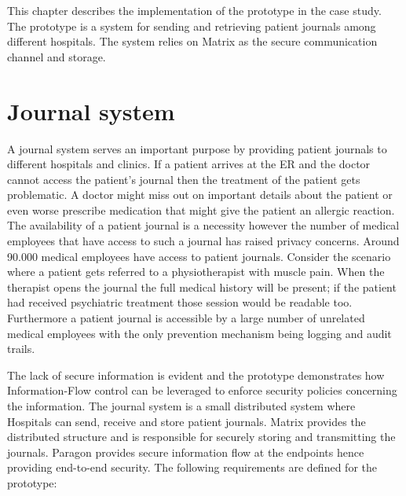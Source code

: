 

This chapter describes the implementation of the prototype in the case study. The prototype is a system for sending and retrieving patient journals among different hospitals. The system relies on Matrix as the secure communication channel and storage.


\section{Journal system}

A journal system serves an important purpose by providing patient journals to different hospitals and clinics. If a patient arrives at the ER and the doctor cannot access the patient's journal then the treatment of the patient gets problematic. A doctor might miss out on important details about the patient or even worse prescribe medication that might give the patient an allergic reaction. The availability of a patient journal is a necessity however the number of medical employees that have access to such a journal has raised privacy concerns. Around 90.000 medical employees have access to patient journals. Consider the scenario where a patient gets referred to a physiotherapist with muscle pain. When the therapist opens the journal the full medical history will be present; if the patient had received psychiatric treatment those session would be readable too. Furthermore a patient journal is accessible by a large number of unrelated medical employees with the only prevention mechanism being logging and audit trails.


The lack of secure information is evident and the prototype demonstrates how Information-Flow control can be leveraged to enforce security policies concerning the information. The journal system is a small distributed system where Hospitals can send, receive and store patient journals. Matrix provides the distributed structure and is responsible for securely storing and transmitting the journals. Paragon provides secure information flow at the endpoints hence providing end-to-end security. 
The following requirements are defined for the prototype:

